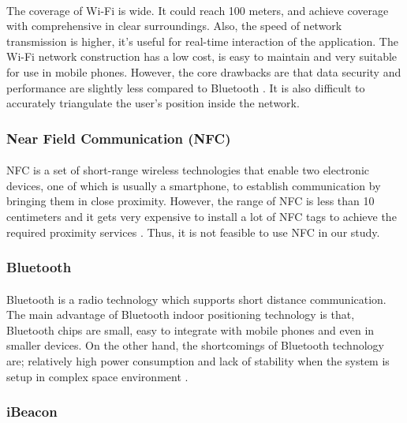 \documentclass[12pt]{article}
\begin{document}
\paragraph{} The coverage of Wi-Fi is wide. It could reach 100 meters, and achieve coverage with comprehensive in clear surroundings. Also, the speed of network transmission is higher, it’s useful for real-time interaction of the application. The Wi-Fi network construction has a low cost, is easy to maintain and very suitable for use in mobile phones. However, the core drawbacks are that data security and performance are slightly less compared to Bluetooth \cite{indoor}. It is also difficult to accurately triangulate the user's position inside the network.

\subsubsection{Near Field Communication (NFC)}
\paragraph{}NFC is a set of short-range wireless technologies that enable two electronic devices, one of which is usually a smartphone, to establish communication by bringing them in close proximity. However, the range  of NFC is less than 10 centimeters and it gets very expensive to install a lot of NFC tags to achieve the required proximity services \cite{tracking}. Thus, it is not feasible to use NFC in our study.

\subsubsection{Bluetooth}
\paragraph{}Bluetooth is a radio technology which supports short distance communication. The main advantage of Bluetooth indoor positioning technology is that, Bluetooth chips are small, easy to integrate with mobile phones and even in smaller devices. On the other hand, the shortcomings of Bluetooth technology are;  relatively high power consumption and lack of stability when the system is setup in complex space environment \cite{indoor}. 

\subsubsection{iBeacon}
\end{document}
